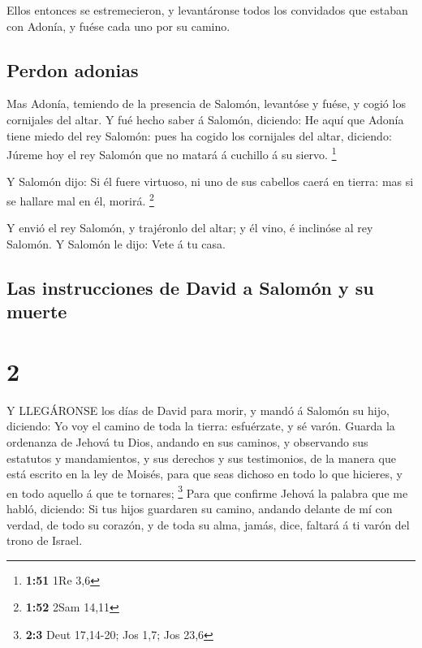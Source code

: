 Ellos entonces se estremecieron, y levantáronse todos los
convidados que estaban con Adonía, y fuése cada uno por su camino.

\hypertarget{perdon-adonias}{%
\subsection{Perdon adonias}\label{perdon-adonias}}

 Mas Adonía, temiendo de la presencia de Salomón, levantóse
y fuése, y cogió los cornijales del altar.  Y fué hecho
saber á Salomón, diciendo: He aquí que Adonía tiene miedo del rey
Salomón: pues ha cogido los cornijales del altar, diciendo: Júreme hoy
el rey Salomón que no matará á cuchillo á su siervo. \footnote{\textbf{1:51}
  1Re 3,6}

 Y Salomón dijo: Si él fuere virtuoso, ni uno de sus
cabellos caerá en tierra: mas si se hallare mal en él, morirá.
\footnote{\textbf{1:52} 2Sam 14,11}

 Y envió el rey Salomón, y trajéronlo del altar; y él vino,
é inclinóse al rey Salomón. Y Salomón le dijo: Vete á tu casa.

\hypertarget{las-instrucciones-de-david-a-salomuxf3n-y-su-muerte}{%
\subsection{Las instrucciones de David a Salomón y su
muerte}\label{las-instrucciones-de-david-a-salomuxf3n-y-su-muerte}}

\hypertarget{section-1}{%
\section{2}\label{section-1}}

 Y LLEGÁRONSE los días de David para morir, y mandó á
Salomón su hijo, diciendo:  Yo voy el camino de toda la
tierra: esfuérzate, y sé varón.  Guarda la ordenanza de
Jehová tu Dios, andando en sus caminos, y observando sus estatutos y
mandamientos, y sus derechos y sus testimonios, de la manera que está
escrito en la ley de Moisés, para que seas dichoso en todo lo que
hicieres, y en todo aquello á que te tornares; \footnote{\textbf{2:3}
  Deut 17,14-20; Jos 1,7; Jos 23,6}  Para que confirme
Jehová la palabra que me habló, diciendo: Si tus hijos guardaren su
camino, andando delante de mí con verdad, de todo su corazón, y de toda
su alma, jamás, dice, faltará á ti varón del trono de Israel.


